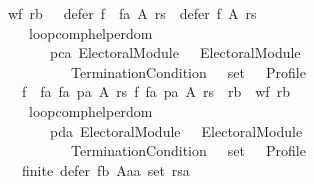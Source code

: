 \begin{isabellebody}
\ \ \ \ \ \ \ \ \ \ wf\ rb\ {\isasymand}\ {\isasymnot}\ defer\ {\isacharparenleft}{\kern0pt}f\ {\isasymtriangleright}\ fa{\isacharparenright}{\kern0pt}\ A\ rs\ {\isasymsubset}\ defer\ f\ A\ rs\ {\isasymand}\isanewline
\ \ \ \ \ \ \ \ \ \ \ \ {\isasymnot}\ loop{\isacharunderscore}{\kern0pt}comp{\isacharunderscore}{\kern0pt}helper{\isacharunderscore}{\kern0pt}dom\isanewline
\ \ \ \ \ \ \ \ \ \ \ \ \ \ \ \ {\isacharparenleft}{\kern0pt}pc{\isacharcolon}{\kern0pt}{\isacharcolon}{\kern0pt}{\isacharparenleft}{\kern0pt}{\isacharprime}{\kern0pt}a\ Electoral{\isacharunderscore}{\kern0pt}Module{\isacharparenright}{\kern0pt}\ {\isasymtimes}\ {\isacharparenleft}{\kern0pt}{\isacharunderscore}{\kern0pt}\ Electoral{\isacharunderscore}{\kern0pt}Module{\isacharparenright}{\kern0pt}\ {\isasymtimes}\isanewline
\ \ \ \ \ \ \ \ \ \ \ \ \ \ \ \ \ \ {\isacharparenleft}{\kern0pt}{\isacharunderscore}{\kern0pt}\ Termination{\isacharunderscore}{\kern0pt}Condition{\isacharparenright}{\kern0pt}\ {\isasymtimes}\ {\isacharunderscore}{\kern0pt}\ set\ {\isasymtimes}\ {\isacharunderscore}{\kern0pt}\ Profile{\isacharparenright}{\kern0pt}\ {\isasymor}\isanewline
\ \ \ \ \ \ \ \ \ \ \ \ {\isacharparenleft}{\kern0pt}{\isacharparenleft}{\kern0pt}f\ {\isasymtriangleright}\ fa{\isacharcomma}{\kern0pt}\ fa{\isacharcomma}{\kern0pt}\ pa{\isacharcomma}{\kern0pt}\ A{\isacharcomma}{\kern0pt}\ rs{\isacharparenright}{\kern0pt}{\isacharcomma}{\kern0pt}\ f{\isacharcomma}{\kern0pt}\ fa{\isacharcomma}{\kern0pt}\ pa{\isacharcomma}{\kern0pt}\ A{\isacharcomma}{\kern0pt}\ rs{\isacharparenright}{\kern0pt}\ {\isasymin}\ rb\ {\isasymand}\ wf\ rb\ {\isasymand}\isanewline
\ \ \ \ \ \ \ \ \ \ \ \ {\isasymnot}\ loop{\isacharunderscore}{\kern0pt}comp{\isacharunderscore}{\kern0pt}helper{\isacharunderscore}{\kern0pt}dom\isanewline
\ \ \ \ \ \ \ \ \ \ \ \ \ \ \ \ {\isacharparenleft}{\kern0pt}pd{\isacharcolon}{\kern0pt}{\isacharcolon}{\kern0pt}{\isacharparenleft}{\kern0pt}{\isacharprime}{\kern0pt}a\ Electoral{\isacharunderscore}{\kern0pt}Module{\isacharparenright}{\kern0pt}\ {\isasymtimes}\ {\isacharparenleft}{\kern0pt}{\isacharunderscore}{\kern0pt}\ Electoral{\isacharunderscore}{\kern0pt}Module{\isacharparenright}{\kern0pt}\ {\isasymtimes}\isanewline
\ \ \ \ \ \ \ \ \ \ \ \ \ \ \ \ \ \ {\isacharparenleft}{\kern0pt}{\isacharunderscore}{\kern0pt}\ Termination{\isacharunderscore}{\kern0pt}Condition{\isacharparenright}{\kern0pt}\ {\isasymtimes}\ {\isacharunderscore}{\kern0pt}\ set\ {\isasymtimes}\ {\isacharunderscore}{\kern0pt}\ Profile{\isacharparenright}{\kern0pt}\ {\isasymor}\isanewline
\ \ \ \ \ \ \ \ \ \ \ \ finite\ {\isacharparenleft}{\kern0pt}defer\ fb\ {\isacharparenleft}{\kern0pt}Aa{\isacharcolon}{\kern0pt}{\isacharcolon}{\kern0pt}{\isacharprime}{\kern0pt}a\ set{\isacharparenright}{\kern0pt}\ rsa{\isacharparenright}{\kern0pt}\ {\isasymand}\isanewline

\end{isabellebody}
